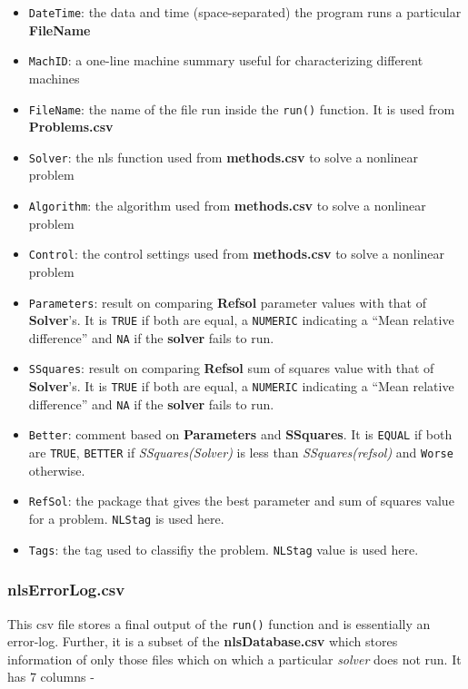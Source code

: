 \begin{itemize}
\tightlist
\item
  \texttt{DateTime}: the data and time (space-separated) the program
  runs a particular \textbf{FileName}
\item
  \texttt{MachID}: a one-line machine summary useful for characterizing
  different machines
\item
  \texttt{FileName}: the name of the file run inside the \texttt{run()}
  function. It is used from \textbf{Problems.csv}
\item
  \texttt{Solver}: the nls function used from \textbf{methods.csv} to
  solve a nonlinear problem
\item
  \texttt{Algorithm}: the algorithm used from \textbf{methods.csv} to
  solve a nonlinear problem
\item
  \texttt{Control}: the control settings used from \textbf{methods.csv}
  to solve a nonlinear problem
\item
  \texttt{Parameters}: result on comparing \textbf{Refsol} parameter
  values with that of \textbf{Solver}'s. It is \texttt{TRUE} if both are
  equal, a \texttt{NUMERIC} indicating a ``Mean relative difference''
  and \texttt{NA} if the \textbf{solver} fails to run.
\item
  \texttt{SSquares}: result on comparing \textbf{Refsol} sum of squares
  value with that of \textbf{Solver}'s. It is \texttt{TRUE} if both are
  equal, a \texttt{NUMERIC} indicating a ``Mean relative difference''
  and \texttt{NA} if the \textbf{solver} fails to run.
\item
  \texttt{Better}: comment based on \textbf{Parameters} and
  \textbf{SSquares}. It is \texttt{EQUAL} if both are \texttt{TRUE},
  \texttt{BETTER} if \emph{SSquares(Solver)} is less than
  \emph{SSquares(refsol)} and \texttt{Worse} otherwise.
\item
  \texttt{RefSol}: the package that gives the best parameter and sum of
  squares value for a problem. \texttt{NLStag} is used here.
\item
  \texttt{Tags}: the tag used to classifiy the problem. \texttt{NLStag}
  value is used here.
\end{itemize}

\hypertarget{nlserrorlog.csv}{%
\subsubsection{nlsErrorLog.csv}\label{nlserrorlog.csv}}

This csv file stores a final output of the \texttt{run()} function and
is essentially an error-log. Further, it is a subset of the
\textbf{nlsDatabase.csv} which stores information of only those files
which on which a particular \emph{solver} does not run. It has 7 columns
-

